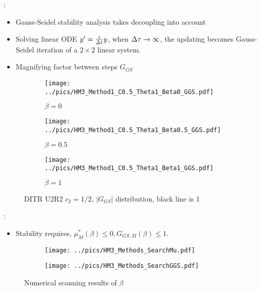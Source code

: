 \documentclass[aspectratio=169,serif]{beamer} %
\begin{document}
\begin{frame}{\secname: \subsecname}
  \begin{itemize}
    \small
    \item Gauss-Seidel stability analysis takes decoupling into account
    \item Solving linear ODE $y'=\frac{z}{{\Delta} t}y$, when ${\Delta} \tau\rightarrow\infty$, the updating becomes
          Gauss-Seidel iteration of a $2\times 2$ linear system.
    \item Magnifying factor between steps $G_{GS}$
  \end{itemize}
  \begin{figure}[htbp]
    \centering
    \begin{subfigure}{0.33\textwidth}
      \texttt{[image: ../pics/HM3\_Method1\_C0.5\_Theta1\_Beta0\_GGS.pdf]}
      \caption[]{$\beta = 0$}
    \end{subfigure}\hfill
    \begin{subfigure}{0.33\textwidth}
      \texttt{[image: ../pics/HM3\_Method1\_C0.5\_Theta1\_Beta0.5\_GGS.pdf]}
      \caption[]{$\beta = 0.5$}
    \end{subfigure}\hfill
    \begin{subfigure}{0.33\textwidth}
      \texttt{[image: ../pics/HM3\_Method1\_C0.5\_Theta1\_Beta1\_GGS.pdf]}
      \caption[]{$\beta = 1$}
    \end{subfigure}
    \caption{DITR U2R2 $c_2=1/2$, $|G_{GS}|$ distribution, black line is 1}
    \label{fig:GGSU2R2}
  \end{figure}
\end{frame}

\begin{frame}{\secname: \subsecname}
  \footnotesize
  \begin{itemize}
    \item Stability requires, $\mu^*_{M}(\beta) \leq 0,G_{GS,M}(\beta) \leq 1$.
  \end{itemize}
  \begin{figure}[htbp]
    \centering
    \begin{subfigure}{0.45\textwidth}
      \texttt{[image: ../pics/HM3\_Methods\_SearchMu.pdf]}
    \end{subfigure}
    \begin{subfigure}{0.45\textwidth}
      \texttt{[image: ../pics/HM3\_Methods\_SearchGGS.pdf]}
    \end{subfigure}
    \caption{Numerical scanning results of $\beta$}
    \label{fig:MuGGSSearch}
  \end{figure}
\end{frame}
\end{document}

